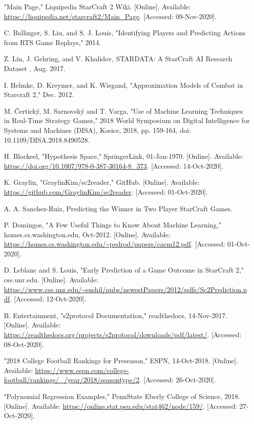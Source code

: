 \documentclass[a4paper,12pt]{report}
\begin{document}
\begin{enumerate}[label={[\arabic*]}]
\item "Main Page," Liquipedia StarCraft 2 Wiki. [Online]. Available: \url{https://liquipedia.net/starcraft2/Main_Page}. [Accessed: 09-Nov-2020].
\item C. Ballinger, S. Liu, and S. J. Louis, "Identifying Players and Predicting Actions from RTS Game Replays," 2014.
\item Z. Lin, J. Gehring, and V. Khalidov, STARDATA: A StarCraft AI Research Dataset , Aug. 2017.
\item I. Helmke, D. Kreymer, and K. Wiegand, "Approximation Models of Combat in Starcraft 2," Dec. 2012.
\item M. Čertický, M. Sarnovský and T. Varga, "Use of Machine Learning Techniques in Real-Time Strategy Games," 2018 World Symposium on Digital Intelligence for Systems and Machines (DISA), Kosice, 2018, pp. 159-164, doi: 10.1109/DISA.2018.8490528.
\item H. Blockeel, "Hypothesis Space," SpringerLink, 01-Jan-1970. [Online]. Available: \url{https://doi.org/10.1007/978-0-387-30164-8_373}. [Accessed: 14-Oct-2020].
\item K. Graylin, "GraylinKim/sc2reader," GitHub. [Online]. Available: \url{https://github.com/GraylinKim/sc2reader}. [Accessed: 01-Oct-2020].
\item A. A. Sanchez-Ruiz, Predicting the Winner in Two Player StarCraft Games.
\item P. Domingos, "A Few Useful Things to Know About Machine Learning," homes.cs.washington.edu, Oct-2012. [Online]. Available: \url{https://homes.cs.washington.edu/~pedrod/papers/cacm12.pdf}. [Accessed: 01-Oct-2020]. 
\item D. Leblanc and S. Louis, "Early Prediction of a Game Outcome in StarCraft 2," cse.unr.edu. [Online]. Available: \url{https://www.cse.unr.edu/~sushil/pubs/newestPapers/2012/pdfs/Sc2Prediction.pdf}. [Accessed: 12-Oct-2020]. 
\item B. Entertainment, "s2protocol Documentation," readthedocs, 14-Nov-2017. [Online]. Available: \url{https://readthedocs.org/projects/s2protocol/downloads/pdf/latest/}. [Accessed: 08-Oct-2020]. 
\item "2018 College Football Rankings for Preseason," ESPN, 14-Oct-2018. [Online]. Available: \url{https://www.espn.com/college-football/rankings/_/year/2018/seasontype/2}. [Accessed: 26-Oct-2020]. 
\item "Polynomial Regression Examples," PennState Eberly College of Science, 2018. [Online]. Available: \url{https://online.stat.psu.edu/stat462/node/159/}. [Accessed: 27-Oct-2020]. 

\end{enumerate}
\end{document}
